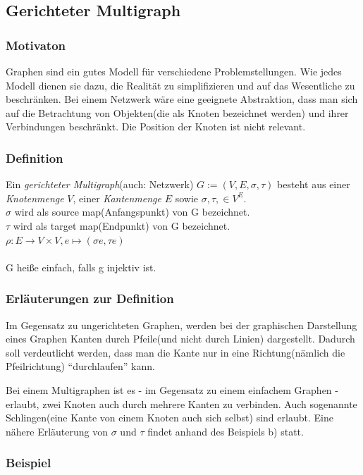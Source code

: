 \subsection{Gerichteter Multigraph}
\subsubsection{Motivaton}
Graphen sind ein gutes Modell für verschiedene Problemstellungen.
Wie jedes Modell dienen sie dazu, die Realität zu simplifizieren und auf das Wesentliche zu beschränken.
Bei einem Netzwerk wäre eine geeignete Abstraktion, dass man sich auf die Betrachtung von Objekten(die als Knoten bezeichnet werden) und ihrer Verbindungen beschränkt.
Die Position der Knoten ist nicht relevant.


\subsubsection{Definition}
Ein \emph{gerichteter Multigraph}(auch: Netzwerk) $G:= (V,E,\sigma,\tau) $ besteht aus einer \emph{Knotenmenge} $V$, einer \emph{Kantenmenge} $E$ sowie
$\sigma , \tau , \in V^E $.
\\ $\sigma $ wird als source map(Anfangspunkt) von G bezeichnet.
\\ $\tau $ wird als target map(Endpunkt) von G bezeichnet.
\\ $\rho : E \rightarrow V \times V, e \mapsto (\sigma e, \tau e) $
\\
\\G heiße einfach, falls g injektiv ist.

\subsubsection{Erläuterungen zur Definition}
Im Gegensatz zu ungerichteten Graphen, werden bei der graphischen Darstellung eines Graphen Kanten durch Pfeile(und nicht durch Linien) dargestellt.
Dadurch soll verdeutlicht werden, dass man die Kante nur in eine Richtung(nämlich die Pfeilrichtung) ``durchlaufen'' kann.

Bei einem Multigraphen ist es - im Gegensatz zu einem einfachem Graphen - erlaubt, zwei Knoten auch durch mehrere Kanten zu verbinden.
Auch sogenannte Schlingen(eine Kante von einem Knoten auch sich selbst) sind erlaubt.
Eine nähere Erläuterung von $\sigma$ und $\tau$ findet anhand des Beispiels b) statt.

\subsubsection{Beispiel}
